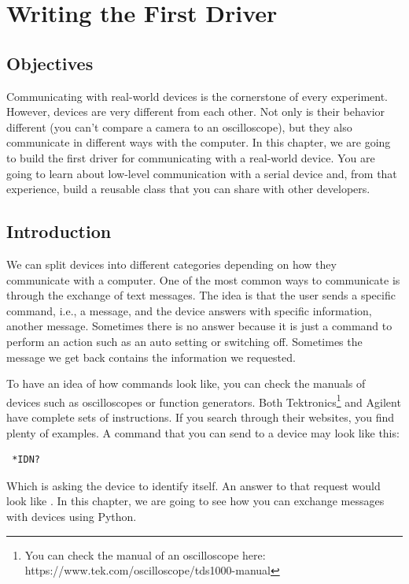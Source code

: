 \chapter{Writing the First Driver}\label{ch:first-driver}

\section{Objectives}\label{sec:driver-objectives}
Communicating with real-world devices is the cornerstone of every experiment. However, devices are very different from each other. Not only is their behavior different (you can't compare a camera to an oscilloscope), but they also communicate in different ways with the computer. In this chapter,
we are going to build the first driver for communicating with a real-world device. You are going to learn about low-level communication with a serial device and, from that experience, build a reusable class that you can share with other developers.

\section{Introduction}\label{sec:driver-introduction}
We can split devices into different categories depending on how they communicate with a computer. One of the most common ways to communicate is through the exchange of text messages. The idea is that the user sends a specific command, i.e., a message, and the device answers with specific information, another message. Sometimes there is no answer because it is just a command to perform an action such as an auto setting or switching off. Sometimes the message we get back contains the information we requested.

To have an idea of how commands look like, you can check the manuals of devices such as oscilloscopes or function generators. Both Tektronics\footnote{You can check the manual of an oscilloscope here: https://www.tek.com/oscilloscope/tds1000-manual} and Agilent have complete sets of instructions. If you search through their websites, you find plenty of examples. A command that you can send to a device may look like this:

\begin{verbatim}
 *IDN?
\end{verbatim}

Which is asking the device to identify itself. An answer to that request would look like . In this chapter, we are going to see how you can exchange messages with devices using Python.

